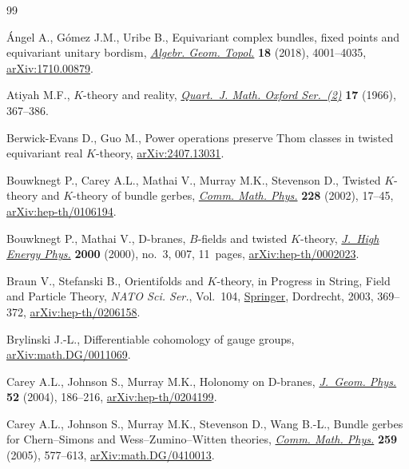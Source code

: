 \begin{thebibliography}{99}
\footnotesize\itemsep=-0.8pt\selectfont

{\'A}ngel A., G\'omez J.M., Uribe B., Equivariant complex bundles, fixed points
 and equivariant unitary bordism,
 \href{https://doi.org/10.2140/agt.2018.18.4001}{\textit{Algebr. Geom.
 Topol.}} \textbf{18} (2018), 4001--4035,
 \href{http://arxiv.org/abs/1710.00879}{arXiv:1710.00879}.

Atiyah M.F., {$K$}-theory and reality,
 \href{https://doi.org/10.1093/qmath/17.1.367}{\textit{Quart.~J. Math. Oxford
 Ser.~(2)}} \textbf{17} (1966), 367--386.

Berwick-Evans D., Guo M., Power operations preserve {T}hom classes in twisted
 equivariant real {$K$}-theory,
 \href{http://arxiv.org/abs/2407.13031}{arXiv:2407.13031}.

Bouwknegt P., Carey A.L., Mathai V., Murray M.K., Stevenson D., Twisted
 {$K$}-theory and {$K$}-theory of bundle gerbes,
 \href{https://doi.org/10.1007/s002200200646}{\textit{Comm. Math. Phys.}}
 \textbf{228} (2002), 17--45,
 \href{http://arxiv.org/abs/hep-th/0106194}{arXiv:hep-th/0106194}.

Bouwknegt P., Mathai V., D-branes, {$B$}-fields and twisted {$K$}-theory,
 \href{https://doi.org/10.1088/1126-6708/2000/03/007}{\textit{J.~High Energy
 Phys.}} \textbf{2000} (2000), no.~3, 007, 11~pages,
 \href{http://arxiv.org/abs/hep-th/0002023}{arXiv:hep-th/0002023}.

Braun V., Stefanski B., Orientifolds and {$K$}-theory, in Progress in {S}tring,
 {F}ield and {P}article {T}heory, \textit{NATO Sci. Ser.}, Vol.~104,
 \href{https://doi.org/10.1007/978-94-010-0211-0_16}{Springer}, Dordrecht,
 2003, 369--372,
 \href{http://arxiv.org/abs/hep-th/0206158}{arXiv:hep-th/0206158}.

Brylinski J.-L., Differentiable cohomology of gauge groups,
 \href{http://arxiv.org/abs/math.DG/0011069}{arXiv:math.DG/0011069}.

Carey A.L., Johnson S., Murray M.K., Holonomy on {D}-branes,
 \href{https://doi.org/10.1016/j.geomphys.2004.02.008}{\textit{J.~Geom.
 Phys.}} \textbf{52} (2004), 186--216,
 \href{http://arxiv.org/abs/hep-th/0204199}{arXiv:hep-th/0204199}.

Carey A.L., Johnson S., Murray M.K., Stevenson D., Wang B.-L., Bundle gerbes for
 {C}hern--{S}imons and {W}ess--{Z}umino--{W}itten theories,
 \href{https://doi.org/10.1007/s00220-005-1376-8}{\textit{Comm. Math. Phys.}}
 \textbf{259} (2005), 577--613,
 \href{http://arxiv.org/abs/math.DG/0410013}{arXiv:math.DG/0410013}.


\end{thebibliography}
